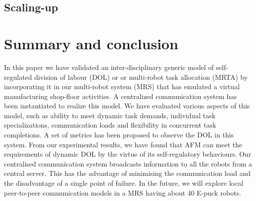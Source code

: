 \subsection*{Scaling-up}
\section{Summary and conclusion}
\label{afm:conc}
In this paper we have validated an inter-disciplinary generic model of self-regulated division of labour (DOL) or or multi-robot task allocation (MRTA) by incorporating it in our multi-robot system (MRS) that has emulated a virtual manufacturing shop-floor activities. A centralized communication system has been instantiated to realize this model. We have evaluated various aspects of this model, such as ability to meet dynamic task demands, individual task specializations, communication loads and flexibility in concurrent task completions. A set of metrics has been proposed to observe the DOL in this system. From our experimental results, we have found that AFM can meet the requirements of dynamic DOL by the virtue of its self-regulatory behaviours. Our centralised communication system broadcasts information to all the robots from a central server. This has the advantage of minimising the communication load and the disadvantage of a single point of failure. In the future, we will explore local peer-to-peer communication models in a MRS having about 40 E-puck robots.
